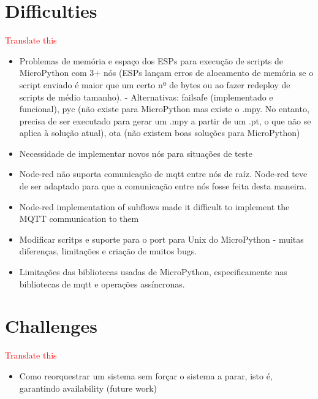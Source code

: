 \section{Difficulties}

\textcolor{red}{Translate this}

\begin{itemize}
    \item Problemas de memória e espaço dos ESPs para execução de scripts de MicroPython com 3+ nós (ESPs lançam erros de alocamento de memória se o script enviado é maior que um certo nº de bytes ou ao fazer redeploy de scripts de médio tamanho). - Alternativas: failsafe (implementado e funcional), pyc (não existe para MicroPython mas existe o .mpy. No entanto, precisa de ser executado para gerar um .mpy a partir de um .pt, o que não se aplica à solução atual), ota (não existem boas soluções para MicroPython)
    \item Necessidade de implementar novos nós para situações de teste
    \item Node-red não suporta comunicação de mqtt entre nós de raíz. Node-red teve de ser adaptado para que a comunicação entre nós fosse feita desta maneira.
    \item Node-red implementation of subflows made it difficult to implement the MQTT communication to them
    \item Modificar scritps e suporte para o port para Unix do MicroPython - muitas diferenças, limitações e criação de muitos bugs.
    \item Limitações das bibliotecas usadas de MicroPython, especificamente nas bibliotecas de mqtt e operações assíncronas.
\end{itemize}{}

\section{Challenges}
\textcolor{red}{Translate this}
\begin{itemize}
    \item Como reorquestrar um sistema sem forçar o sistema a parar, isto é, garantindo availability (future work)
\end{itemize}


